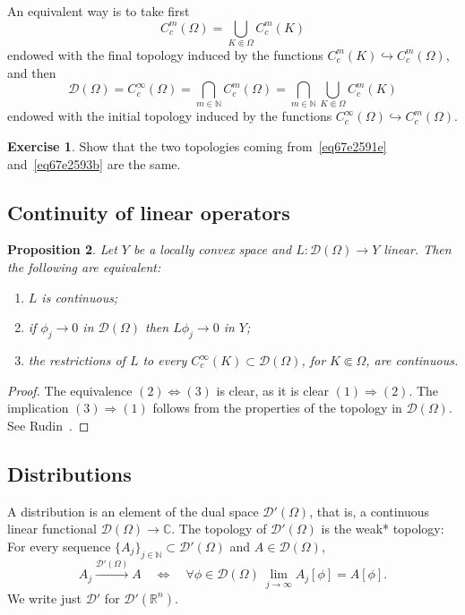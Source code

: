 \documentclass[a4paper,9pt]{amsart}
\newcommand{\scr}[1]{\mathscr{#1}}
\newcommand{\N}{\mathbb{N}}	%
\newcommand{\R}{\mathbb{R}}	%
\newcommand{\C}{\mathbb{C}}	%
\newcommand{\into}{\hookrightarrow}		%
\newcommand{\THEN}{\Rightarrow}	%
\newcommand{\IFF}{\Leftrightarrow}	%
\theoremstyle{plain}
\newtheorem{proposition}{Proposition}[section]
\theoremstyle{definition}
\newtheorem{exercise}[proposition]{Exercise}%
\theoremstyle{remark}
\begin{document}
An equivalent way is to take first
\begin{equation}
	C^m_c(\Omega) = \bigcup_{K\Subset\Omega} C^m_c(K)
\end{equation}
endowed with the final topology induced by the functions $C^m_c(K)\into C^m_c(\Omega)$,
and then
\begin{equation}\label{eq67e2593b}
	\scr D(\Omega) = C^\infty_c(\Omega) = \bigcap_{m\in\N} C^m_c(\Omega)
	= \bigcap_{m\in\N}\bigcup_{K\Subset\Omega} C^m_c(K)
\end{equation}
endowed with the initial topology induced by the functions $C^\infty_c(\Omega)\into C^m_c(\Omega)$.


\begin{exercise}
	Show that the two topologies coming from~\eqref{eq67e2591e} and~\eqref{eq67e2593b} are the same.
\end{exercise}

\subsection{Continuity of linear operators}\label{subs67e26996}

\begin{proposition}\label{prop67e26a2f}
	Let $Y$ be a locally convex space and $L:\scr D(\Omega) \to Y$ linear.
	Then the following are equivalent:
	\begin{enumerate}
	\item
	$L$ is continuous;
	\item
	if $\phi_j\to 0$ in $\scr D(\Omega)$ then $L\phi_j\to 0$ in $Y$;
	\item
	the restrictions of $L$ to every $C^\infty_c(K)\subset\scr D(\Omega)$, for $K\Subset\Omega$, are continuous.
	\end{enumerate}
\end{proposition}
\begin{proof}
	The equivalence $(2)\IFF(3)$ is clear, as it is clear $(1)\THEN(2)$.
	The implication $(3)\THEN(1)$ follows from the properties of the topology in $\scr D(\Omega)$.
	See Rudin~\cite[Thm.6.6]{MR1157815}.
\end{proof}


\subsection{Distributions}\label{subs67def3c0}
A distribution is an element of the dual space $\scr D'(\Omega)$, that is, 
a continuous linear functional $\scr D(\Omega)\to\C$.
The topology of $\scr D'(\Omega)$ is the weak* topology:
For every sequence $\{A_j\}_{j\in\N}\subset\scr D'(\Omega)$ and $A\in\scr D(\Omega)$,
\begin{equation}
	A_j\overset{\scr D'(\Omega)}\longrightarrow A
	\quad\IFF\quad
	\forall \phi\in\scr D(\Omega)\ \lim_{j\to\infty} A_j[\phi] = A[\phi] .
\end{equation}
We write just $\scr D'$ for $\scr D'(\R^n)$.
\end{document}
